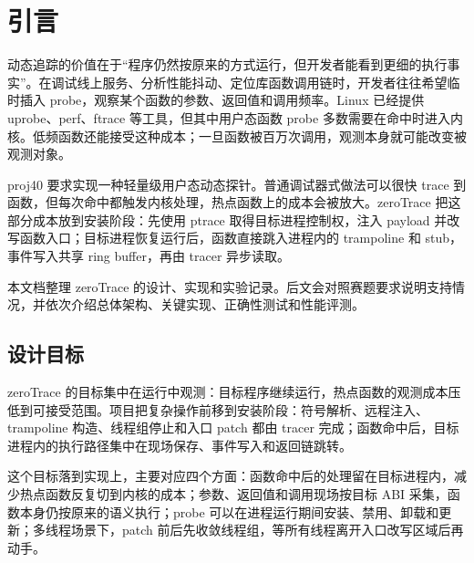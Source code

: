 \documentclass[UTF8,a4paper,11pt,fontset=fandol]{ctexart}
\begin{document}
\section{引言}

动态追踪的价值在于“程序仍然按原来的方式运行，但开发者能看到更细的执行事实”。在调试线上服务、分析性能抖动、定位库函数调用链时，开发者往往希望临时插入 probe，观察某个函数的参数、返回值和调用频率。Linux 已经提供 uprobe、perf、ftrace 等工具，但其中用户态函数 probe 多数需要在命中时进入内核。低频函数还能接受这种成本；一旦函数被百万次调用，观测本身就可能改变被观测对象。

proj40 要求实现一种轻量级用户态动态探针。普通调试器式做法可以很快 trace 到函数，但每次命中都触发内核处理，热点函数上的成本会被放大。zeroTrace 把这部分成本放到安装阶段：先使用 ptrace 取得目标进程控制权，注入 payload 并改写函数入口；目标进程恢复运行后，函数直接跳入进程内的 trampoline 和 stub，事件写入共享 ring buffer，再由 tracer 异步读取。

本文档整理 zeroTrace 的设计、实现和实验记录。后文会对照赛题要求说明支持情况，并依次介绍总体架构、关键实现、正确性测试和性能评测。

\subsection{设计目标}

zeroTrace 的目标集中在运行中观测：目标程序继续运行，热点函数的观测成本压低到可接受范围。项目把复杂操作前移到安装阶段：符号解析、远程注入、trampoline 构造、线程组停止和入口 patch 都由 tracer 完成；函数命中后，目标进程内的执行路径集中在现场保存、事件写入和返回链跳转。

这个目标落到实现上，主要对应四个方面：函数命中后的处理留在目标进程内，减少热点函数反复切到内核的成本；参数、返回值和调用现场按目标 ABI 采集，函数本身仍按原来的语义执行；probe 可以在进程运行期间安装、禁用、卸载和更新；多线程场景下，patch 前后先收敛线程组，等所有线程离开入口改写区域后再动手。
\end{document}
